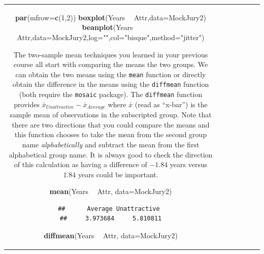 \documentclass[]{book}
\newenvironment{Shaded}{\begin{snugshade}}{\end{snugshade}}
\newcommand{\KeywordTok}[1]{\textcolor[rgb]{0.13,0.29,0.53}{\textbf{#1}}}
\newcommand{\DataTypeTok}[1]{\textcolor[rgb]{0.13,0.29,0.53}{#1}}
\newcommand{\DecValTok}[1]{\textcolor[rgb]{0.00,0.00,0.81}{#1}}
\newcommand{\StringTok}[1]{\textcolor[rgb]{0.31,0.60,0.02}{#1}}
\newcommand{\OperatorTok}[1]{\textcolor[rgb]{0.81,0.36,0.00}{\textbf{#1}}}
\newcommand{\NormalTok}[1]{#1}
\theoremstyle{definition}
\theoremstyle{definition}
\theoremstyle{remark}
\begin{document}
\begin{longtable}[]{@{}ccccccc@{}}
\begin{minipage}[b]{0.10\columnwidth}
\begin{Shaded}
\begin{Highlighting}[]
\KeywordTok{par}\NormalTok{(}\DataTypeTok{mfrow=}\KeywordTok{c}\NormalTok{(}\DecValTok{1}\NormalTok{,}\DecValTok{2}\NormalTok{))}
\KeywordTok{boxplot}\NormalTok{(Years }\OperatorTok{~}\StringTok{ }\NormalTok{Attr,}\DataTypeTok{data=}\NormalTok{MockJury2) }
\KeywordTok{beanplot}\NormalTok{(Years }\OperatorTok{~}\StringTok{ }\NormalTok{Attr,}\DataTypeTok{data=}\NormalTok{MockJury2,}\DataTypeTok{log=}\StringTok{""}\NormalTok{,}\DataTypeTok{col=}\StringTok{"bisque"}\NormalTok{,}\DataTypeTok{method=}\StringTok{"jitter"}\NormalTok{)}
\end{Highlighting}
\end{Shaded}

The two-sample mean techniques you learned in your previous course all
start with comparing the means the two groups. We can obtain the two
means using the \texttt{mean} function or directly obtain the difference
in the means using the \texttt{diffmean} function (both require the
\texttt{mosaic} package). The \texttt{diffmean} function provides
\(\bar{x}_{Unattractive} - \bar{x}_{Average}\) where \(\bar{x}\) (read
as ``x-bar'') is the sample mean of observations in the subscripted
group. Note that there are two directions that you could compare the
means and this function chooses to take the mean from the second group
name \emph{alphabetically} and subtract the mean from the first
alphabetical group name. It is always good to check the direction of
this calculation as having a difference of \(-1.84\) years versus
\(1.84\) years could be important.

\begin{Shaded}
\begin{Highlighting}[]
\KeywordTok{mean}\NormalTok{(Years }\OperatorTok{~}\StringTok{ }\NormalTok{Attr, }\DataTypeTok{data=}\NormalTok{MockJury2)}
\end{Highlighting}
\end{Shaded}

\begin{verbatim}
##      Average Unattractive 
##     3.973684     5.810811
\end{verbatim}

\begin{Shaded}
\begin{Highlighting}[]
\KeywordTok{diffmean}\NormalTok{(Years }\OperatorTok{~}\StringTok{ }\NormalTok{Attr, }\DataTypeTok{data=}\NormalTok{MockJury2)}
\end{Highlighting}
\end{Shaded}


\end{minipage}
\end{longtable}
\end{document}
